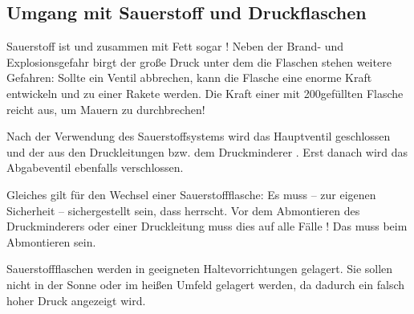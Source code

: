 \subsection{Umgang mit Sauerstoff und Druckflaschen}

{%
Sauerstoff ist  und zusammen mit Fett
sogar ! Neben der Brand- und
Explosionsgefahr birgt der große Druck unter dem die Flaschen
stehen weitere Gefahren: Sollte ein Ventil abbrechen, kann die
Flasche eine enorme Kraft entwickeln und zu einer Rakete
werden. Die Kraft einer mit 200\Bar* gefüllten Flasche reicht
aus, um Mauern zu durchbrechen!


}{
}{}{}{}

{Nach der Verwendung des Sauerstoffsystems wird das
Hauptventil geschlossen und der  aus den
Druckleitungen bzw. dem Druckminderer . Erst
danach wird das Abgabeventil ebenfalls verschlossen.

Gleiches gilt für den Wechsel einer Sauerstoffflasche: Es
muss -- zur eigenen Sicherheit -- sichergestellt sein, dass
 herrscht. Vor
dem Abmontieren des Druckminderers oder einer Druckleitung
muss dies auf alle Fälle ! Das  muss beim Abmontieren
 sein.



}{
}{}{}{}

{
Sauerstoffflaschen werden in geeigneten
Haltevorrichtungen gelagert. Sie sollen nicht in der Sonne
oder im heißen Umfeld gelagert werden, da dadurch ein
falsch hoher Druck angezeigt wird.
}{}
{}{}{}

{
}
{}
{}
{}
{}

